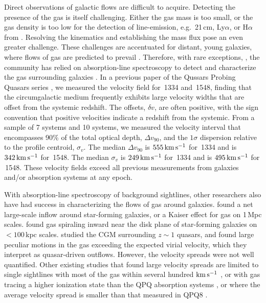 \documentclass[iop]{emulateapj}
\begin{document}
Direct observations of galactic flows are difficult to acquire. Detecting the presence of 
the gas is itself challenging. Either the gas mass is too small, or the gas density is too low for 
the detection of line-emission, e.g.\ 21\,cm, Ly$\alpha$, or H$\alpha$ from . Resolving 
the kinematics and establishing the mass flux pose an even greater challenge. These challenges are 
accentuated for distant, young galaxies, where flows of gas are predicted to prevail 
\citep{Keres+09,Fumagalli+11}. Therefore, with rare exceptions, 
\citep[e.g.][]{Cantalupo+14,Hennawi+15}, the community has relied on absorption-line spectroscopy 
to detect and characterize the gas surrounding galaxies 
\citep[e.g.][]{BergeronBoisse91,Steidel+10,Prochaska+11,Tumlinson+13}. 
In a previous paper of the Qussars Probing Quasars series \citep[][, hereafter QPQ8]{QPQ8}, we 
measured the velocity field for \,1334 and \,1548, finding that the 
circumgalactic medium frequently exhibits large velocity widths that are offset from the systemic 
redshift. The offsets, $\delta v$, are often positive, with the sign convention that positive 
velocities indicate a redshift from the systemic. From a sample of 7  systems and 10 
 systems, we measured the velocity interval that encompasses 90\% of the total optical 
depth, $\Delta v_{90}$, and the $1\sigma$ dispersion relative to the profile centroid, $\sigma_v$. 
The median $\Delta v_{90}$ is $555\,{\rm km\,s^{-1}}$ for \,1334 and is 
$342\,{\rm km\,s^{-1}}$ for \,1548. The median $\sigma_v$ is $249\,{\rm km\,s^{-1}}$ for 
\,1334 and is $495\,{\rm km\,s^{-1}}$ for \,1548. These velocity fields exceed 
all previous measurements from galaxies and/or absorption systems at any epoch. 

With absorption-line spectroscopy of background sightlines, other researchers also have had 
success in characterizing the flows of gas around galaxies. \cite{Rakic+12} found a net 
large-scale inflow around star-forming galaxies, or a Kaiser effect for gas on 
1\,Mpc scales. \cite{Ho+17} found gas spiraling inward near the disk plane of 
star-forming galaxies on $<100$\,kpc scales. \cite{Johnson+15} studied the CGM surrounding 
$z\sim1$ quasars, and 
found large peculiar motions in the gas exceeding the expected virial velocity, which they 
interpret as quasar-driven outflows. However, the velocity spreads were not well quantified. Other 
existing studies that found large velocity spreads are limited to single sightlines with most of 
the gas within several hundred ${\rm km\,s^{-1}}$ \citep[e.g., ][]{Tripp+11}, or with gas tracing 
a higher ionization state than the QPQ absorption systems \citep[e.g., ][]{Churchill+12}, or where 
the average velocity spread is smaller than that measured in QPQ8 
\citep[e.g., ][]{Gauthier13,Muzahid+15,Zahedy+16}. 
\end{document}
